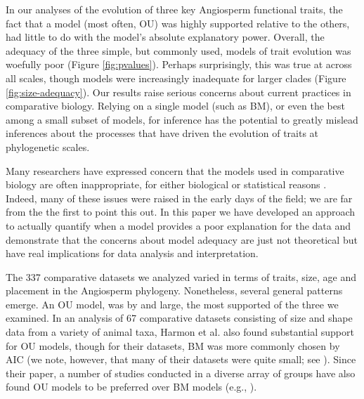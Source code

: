 \documentclass[a4paper,12pt]{article}
\begin{document}
In our analyses of the evolution of three key Angiosperm functional traits, the fact that a model (most often, OU) was highly supported relative to the others, had little to do with the model's absolute explanatory power. Overall, the adequacy of the three simple, but commonly used, models of trait evolution was woefully poor (Figure \ref{fig:pvalues}). Perhaps surprisingly, this was true at across all scales, though models were increasingly inadequate for larger clades (Figure \ref{fig:size-adequacy}). Our results raise serious concerns about current practices in comparative biology. Relying on a single model (such as BM), or even the best among a small subset of models, for inference has the potential to greatly mislead inferences about the processes that have driven the evolution of traits at phylogenetic scales.

Many researchers have expressed concern that the models used in comparative biology are often inappropriate, for either biological or statistical reasons \citep{Felsenstein1985, Felsenstein1988, HarveyPagel1991, Garland1992, Diaz1996, HansenMartins1996, Price1997, Garland1999, GarlandIves2000, HansenOrzack2005, Hansen2012, Felsenstein2012, Boettiger2012, SlaterPennell}. Indeed, many of these issues were raised in the early days of the field; we are far from the the first to point this out.
In this paper we have developed an approach to actually quantify when a model provides a poor explanation for the data and demonstrate that the concerns about model adequacy are just not theoretical but have real implications for data analysis and interpretation.

The 337 comparative datasets we analyzed varied in terms of traits, size, age and placement in the Angiosperm phylogeny. Nonetheless, several general patterns emerge. An OU model, was by and large, the most supported of the three we examined. In an analysis of 67 comparative datasets consisting of size and shape data from a variety of animal taxa, Harmon et al. \citep{Harmon2010} also found substantial support for OU models, though for their datasets, BM was more commonly chosen by AIC (we note, however, that many of their datasets were quite small; see \citep{SlaterPennell}). Since their paper, a number of studies conducted in a diverse array of groups have also found OU models to be preferred over BM models (e.g., \citep{Burbrink2012, Wiens2013, Lopez2013}). 
\end{document}
